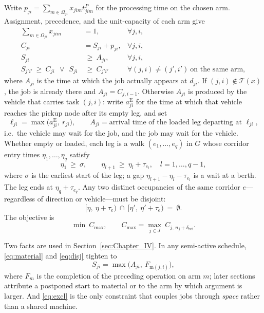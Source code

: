\documentclass[manuscript,screen,review]{acmart}
\begin{document}
Write $p_{ji}=\sum_{m\in\Omega_{ji}}x_{jim}t^P_{jim}$ for the processing time on the chosen arm. Assignment, precedence, and the unit-capacity of each arm give
\begin{align}
\sum_{m\in\Omega_{ji}} x_{jim} &= 1, & \forall j,i,
\label{eq:assign}\\
C_{ji} &= S_{ji}+p_{ji}, & \forall j,i,
\label{eq:dur}\\
S_{ji} &\ \ge\ A_{ji}, & \forall j,i,
\label{eq:material}\\
S_{j'i'}\ \ge\ C_{ji}\ \ \vee\ \ S_{ji} &\ \ge\ C_{j'i'}
& \forall (j,i)\neq(j',i')\ \text{on the same arm},
\label{eq:disj}
\end{align}
where $A_{ji}$ is the time at which the job actually appears at $d_{ji}$.
If $(j,i)\notin\mathcal{T}(x)$, the job is already there and $A_{ji}=C_{j,i-1}$.
Otherwise $A_{ji}$ is produced by the vehicle that carries task $(j,i)$: write $a^{\mathrm{E}}_{ji}$ for the time at which that vehicle reaches the pickup node after its empty leg, and set
\begin{equation}
\label{eq:load}
\ell_{ji}=\max\bigl(a^{\mathrm{E}}_{ji},\ r_{ji}\bigr),
\qquad
A_{ji}=\text{arrival time of the loaded leg departing at }\ell_{ji},
\end{equation}
i.e.\ the vehicle may wait for the job, and the job may wait for the vehicle.
Whether empty or loaded, each leg is a walk $(e_1,\dots,e_q)$ in $G$ whose corridor entry times $\eta_1,\dots,\eta_q$ satisfy
\begin{equation}
\label{eq:walk}
\eta_1 \ \ge\ \sigma, \qquad
\eta_{l+1}\ \ge\ \eta_l+\tau_{e_l}, \quad l=1,\dots,q-1,
\end{equation}
where $\sigma$ is the earliest start of the leg; a gap $\eta_{l+1}-\eta_l-\tau_{e_l}$ is a wait at a berth.
The leg ends at $\eta_q+\tau_{e_q}$.
Any two distinct occupancies of the same corridor $e$---regardless of direction or vehicle---must be disjoint:
\begin{equation}
\label{eq:excl}
\bigl[\eta,\ \eta+\tau_e\bigr)\ \cap\
\bigl[\eta',\ \eta'+\tau_e\bigr)\ =\ \emptyset .
\end{equation}
The objective is
\begin{equation}
\label{eq:obj}
\min\ C_{\max},\qquad
C_{\max}=\max_{j\in J}\ C_{j,\,n_j+\delta_{\mathrm{ret}}} .
\end{equation}

Two facts are used in Section~\ref{sec:Chapter_IV}.
In any semi-active schedule, \eqref{eq:material} and \eqref{eq:disj} tighten to
\begin{equation}
\label{eq:bind}
S_{ji}=\max\bigl(A_{ji},\ F_{\mathrm{m}(j,i)}\bigr),
\end{equation}
where $F_m$ is the completion of the preceding operation on arm $m$; later sections attribute a postponed start to material or to the arm by which argument is larger.
And \eqref{eq:excl} is the only constraint that couples jobs through \emph{space} rather than a shared machine.
\end{document}

